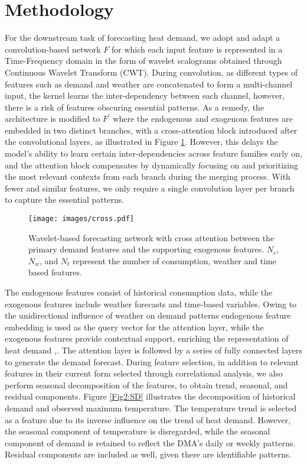 \section{Methodology}

For the downstream task of forecasting heat demand, we adopt and adapt a convolution-based network $F$   \cite{chatterjee2022heat} for which each input feature is represented in a Time-Frequency domain in the form of wavelet scalograms obtained through Continuous Wavelet Transform (CWT). During convolution, as different types of features such as demand and weather are concatenated to form a multi-channel input, the kernel learns the inter-dependency between each channel, however, there is a risk of features obscuring essential patterns. As a remedy, the architecture is modified to $F^{'}$ where the endogenous and exogenous features are embedded in two distinct branches, with a cross-attention block introduced after the convolutional layers, as illustrated in Figure \ref{Fig1:block_diagram}. However, this delays the model's ability to learn certain inter-dependencies across feature families early on, and the attention block compensates by dynamically focusing on and prioritizing the most relevant contexts from each branch during the merging process. With fewer and similar features, we only require a single convolution layer per branch to capture the essential patterns.


\begin{figure}[htbp]
\centering
\texttt{[image: images/cross.pdf]}

\caption{Wavelet-based forecasting network with cross attention between the primary demand features and the supporting exogenous features. $N_{c}$, $N_{w}$, and $N_{t}$ represent the number of consumption, weather and time based features.}
\label{Fig1:block_diagram}
\end{figure}



The endogenous features consist of historical consumption data, while the exogenous features include weather forecasts and time-based variables. Owing to the unidirectional influence of weather on demand patterns endogenous feature embedding is used as the query vector for the attention layer, while the exogenous features provide contextual support, enriching the representation of heat demand \cite{Shih2019},\cite{adiferra}. The attention layer is followed by a series of fully connected layers to generate the demand forecast. During feature selection, in addition to relevant features in their current form selected through correlational analysis, we also perform seasonal decomposition of the features, to obtain trend, seasonal, and residual components. Figure \ref{Fig2:SD} illustrates the decomposition of historical demand and observed maximum temperature. The temperature trend is selected as a feature due to its inverse influence on the trend of heat demand. However, the seasonal component of temperature is disregarded, while the seasonal component of demand is retained to reflect the DMA's daily or weekly patterns. Residual components are included as well, given there are identifiable patterns.


